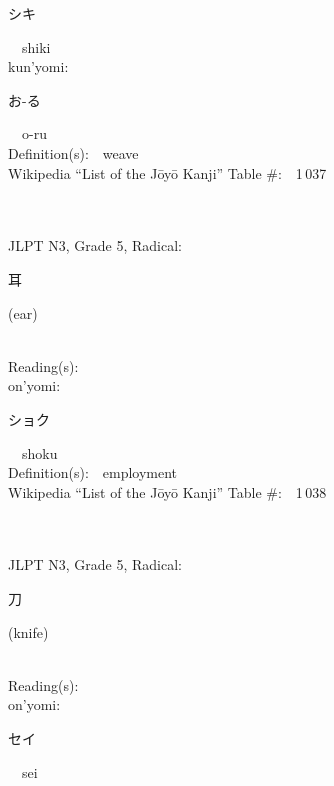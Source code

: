 \begin{multicols}{2}
{\hspace*{2em}}{\begin{CJK}{UTF8}{min} シキ \end{CJK}}\ \ shiki\ \ \\
{\hspace*{1em}}kun'yomi:\ \ \\
{\hspace*{2em}}{\begin{CJK}{UTF8}{min} お-る \end{CJK}}\ \ o-ru\ \ \\
Definition(s):\ \ weave \\
Wikipedia ``List of the J\=oy\=o Kanji'' Table \#:\ \ 1\,037 \\
\ \ \\
{\fontsize{34pt}{40pt}  }\ \ \\  %
{JLPT N3, Grade 5, Radical:\ \ {\begin{CJK}{UTF8}{min} 耳 \end{CJK}} (ear) } \\
Reading(s):\ \ \\
{\hspace*{1em}}on'yomi:\ \ \\
{\hspace*{2em}}{\begin{CJK}{UTF8}{min} ショク \end{CJK}}\ \ shoku\ \ \\
Definition(s):\ \ employment \\
Wikipedia ``List of the J\=oy\=o Kanji'' Table \#:\ \ 1\,038 \\
\ \ \\
{\fontsize{34pt}{40pt}  }\ \ \\  %
{JLPT N3, Grade 5, Radical:\ \ {\begin{CJK}{UTF8}{min} 刀 \end{CJK}} (knife) } \\
Reading(s):\ \ \\
{\hspace*{1em}}on'yomi:\ \ \\
{\hspace*{2em}}{\begin{CJK}{UTF8}{min} セイ \end{CJK}}\ \ sei\ \ \\

\end{multicols}
